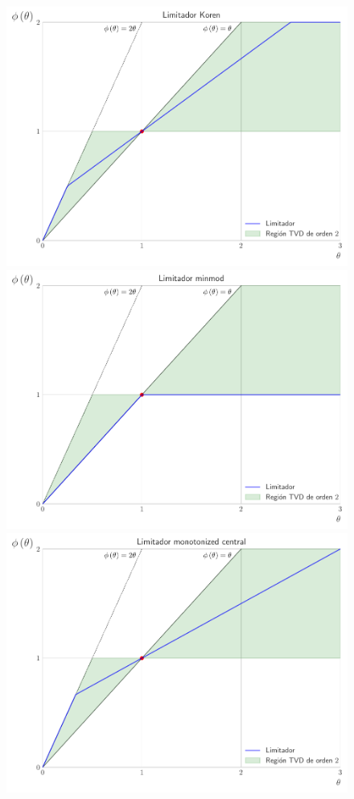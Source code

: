 \begin{figure}[ht!]
	\centering
	\includegraphics[width=.28\paperwidth]{limiters/limiterkoren}
	\includegraphics[width=.28\paperwidth]{limiters/limiterminmod}
	\includegraphics[width=.28\paperwidth]{limiters/limitermonotonizedcentral}

\end{figure}
